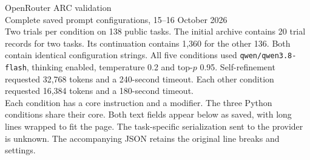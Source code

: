 \documentclass[a4paper,10pt]{article}
\begin{document}
{\LARGE OpenRouter ARC validation}\\[2mm]
{\large Complete saved prompt configurations, 15--16 October 2026}\\[4mm]
Two trials per condition on 138 public tasks. The initial archive contains 20 trial records for two tasks. Its continuation contains 1,360 for the other 136. Both contain identical configuration strings.
All five conditions used \texttt{qwen/qwen3.8-flash}, thinking enabled, temperature 0.2 and top-$p$ 0.95. Self-refinement requested 32,768 tokens and a 240-second timeout. Each other condition requested 16,384 tokens and a 180-second timeout.\\[2mm]
Each condition has a core instruction and a modifier. The three Python conditions share their core. Both text fields appear below as saved, with long lines wrapped to fit the page. The task-specific serialization sent to the provider is unknown. The accompanying JSON retains the original line breaks and settings.

\end{document}
